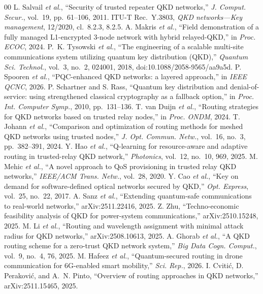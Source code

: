 \documentclass[conference]{IEEEtran}
\begin{document}
\begin{thebibliography}{00}
 L. Salvail \emph{et al.}, ``Security of trusted repeater QKD networks,'' \emph{J. Comput. Secur.}, vol.~19, pp.~61--106, 2011.
 ITU-T Rec.~Y.3803, \emph{QKD networks---Key management}, 12/2020, cl.~8.2.3, 8.2.5.
 A. Makris \emph{et al.}, ``Field demonstration of a fully managed L1-encrypted 3-node network with hybrid relayed-QKD,'' in \emph{Proc. ECOC}, 2024.
 P.~K. Tysowski \emph{et al.}, ``The engineering of a scalable multi-site communications system utilizing quantum key distribution (QKD),'' \emph{Quantum Sci. Technol.}, vol.~3, no.~2, 024001, 2018, doi:10.1088/2058-9565/aa9a5d.
 P. Spooren \emph{et al.}, ``PQC-enhanced QKD networks: a layered approach,'' in \emph{IEEE QCNC}, 2026.
 P. Schartner and S. Rass, ``Quantum key distribution and denial-of-service: using strengthened classical cryptography as a fallback option,'' in \emph{Proc. Int. Computer Symp.}, 2010, pp.~131--136.
 T. van Duijn \emph{et al.}, ``Routing strategies for QKD networks based on trusted relay nodes,'' in \emph{Proc. ONDM}, 2024.
 T. Johann \emph{et al.}, ``Comparison and optimization of routing methods for meshed QKD networks using trusted nodes,'' \emph{J. Opt. Commun. Netw.}, vol.~16, no.~3, pp.~382--391, 2024.
 Y. Hao \emph{et al.}, ``Q-learning for resource-aware and adaptive routing in trusted-relay QKD network,'' \emph{Photonics}, vol.~12, no.~10, 969, 2025.
 M. Mehic \emph{et al.}, ``A novel approach to QoS provisioning in trusted relay QKD networks,'' \emph{IEEE/ACM Trans. Netw.}, vol.~28, 2020.
 Y. Cao \emph{et al.}, ``Key on demand for software-defined optical networks secured by QKD,'' \emph{Opt. Express}, vol.~25, no.~22, 2017.
 A. Sanz \emph{et al.}, ``Extending quantum-safe communications to real-world networks,'' arXiv:2511.22416, 2025.
 Z. Zhu, ``Techno-economic feasibility analysis of QKD for power-system communications,'' arXiv:2510.15248, 2025.
 M. Li \emph{et al.}, ``Routing and wavelength assignment with minimal attack radius for QKD networks,'' arXiv:2508.10613, 2025.
 A. Ghorab \emph{et al.}, ``A QKD routing scheme for a zero-trust QKD network system,'' \emph{Big Data Cogn. Comput.}, vol.~9, no.~4, 76, 2025.
 M. Hafeez \emph{et al.}, ``Quantum-secured routing in drone communication for 6G-enabled smart mobility,'' \emph{Sci. Rep.}, 2026.
 I. Cviti\'c, D. Perakovi\'c, and A.~N. Pinto, ``Overview of routing approaches in QKD networks,'' arXiv:2511.15465, 2025.

\end{thebibliography}
\end{document}
